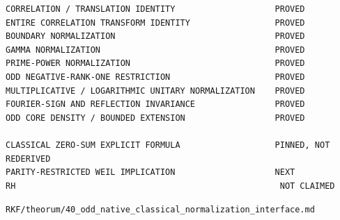 \begin{verbatim}
CORRELATION / TRANSLATION IDENTITY                    PROVED
ENTIRE CORRELATION TRANSFORM IDENTITY                 PROVED
BOUNDARY NORMALIZATION                                PROVED
GAMMA NORMALIZATION                                   PROVED
PRIME-POWER NORMALIZATION                             PROVED
ODD NEGATIVE-RANK-ONE RESTRICTION                     PROVED
MULTIPLICATIVE / LOGARITHMIC UNITARY NORMALIZATION    PROVED
FOURIER-SIGN AND REFLECTION INVARIANCE                PROVED
ODD CORE DENSITY / BOUNDED EXTENSION                  PROVED

CLASSICAL ZERO-SUM EXPLICIT FORMULA                   PINNED, NOT REDERIVED
PARITY-RESTRICTED WEIL IMPLICATION                    NEXT
RH                                                     NOT CLAIMED
\end{verbatim}

\begin{flushright}\small\texttt{RKF/theorum/40\_odd\_native\_classical\_normalization\_interface.md}\end{flushright}
